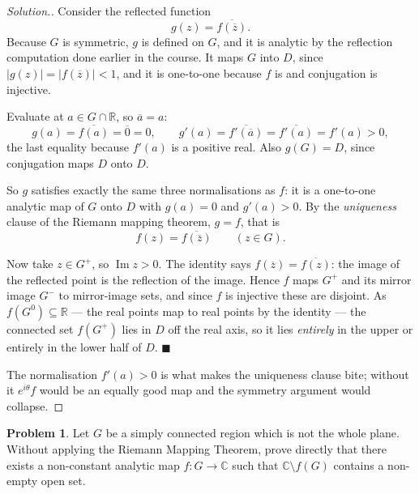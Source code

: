 \documentclass[11pt,a4paper]{article}
\theoremstyle{definition}
\newtheorem{problemx}{Problem}[section]
\newenvironment{problem}{\begin{problemx}}{\end{problemx}}
\newenvironment{solution}
  {\renewcommand{\qedsymbol}{}\begin{proof}[\textit{Solution}.]}
  {\end{proof}}
\begin{document}
\begin{solution}
Consider the reflected function
$$g(z) = \overline{f\!\left(\overline{z}\right)} .$$
Because $G$ is symmetric, $g$ is defined on $G$, and it is analytic by the
reflection computation done earlier in the course. It maps $G$ into $D$, since
$\left|g(z)\right| = \left|f(\overline{z})\right| < 1$, and it is one-to-one
because $f$ is and conjugation is injective.

Evaluate at $a \in G \cap \mathbb{R}$, so $\overline{a} = a$:
$$g(a) = \overline{f(a)} = \overline{0} = 0,
\qquad
g'(a) = \overline{f'\!\left(\overline{a}\right)} = \overline{f'(a)} = f'(a) > 0,$$
the last equality because $f'(a)$ is a positive real. Also $g(G) = D$, since
conjugation maps $D$ onto $D$.

So $g$ satisfies exactly the same three normalisations as $f$: it is a one-to-one
analytic map of $G$ onto $D$ with $g(a) = 0$ and $g'(a) > 0$. By the
\emph{uniqueness} clause of the Riemann mapping theorem, $g = f$, that is
$$f(z) = \overline{f\!\left(\overline{z}\right)} \qquad (z \in G).$$

Now take $z \in G^{+}$, so $\operatorname{Im}z > 0$. The identity says
$f(\overline{z}) = \overline{f(z)}$: the image of the reflected point is the
reflection of the image. Hence $f$ maps $G^{+}$ and its mirror image
$G^{-}$ to mirror-image sets, and since $f$ is injective these are disjoint. As
$f(G^{0}) \subseteq \mathbb{R}$ --- the real points map to real points by the
identity --- the connected set $f(G^{+})$ lies in $D$ off the real axis, so it lies
\emph{entirely} in the upper or entirely in the lower half of $D$. $\blacksquare$

The normalisation $f'(a) > 0$ is what makes the uniqueness clause bite; without it
$e^{i\theta}f$ would be an equally good map and the symmetry argument would
collapse.
\end{solution}


\begin{problem}
Let $G$ be a simply connected region which is not the whole plane. Without
applying the Riemann Mapping Theorem, prove directly that there exists a
non-constant analytic map $f : G \rightarrow \mathbb{C}$ such that
$\mathbb{C}\setminus f(G)$ contains a non-empty open set.
\end{problem}
\end{document}
